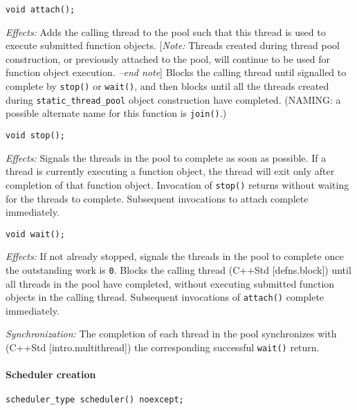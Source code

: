 \documentclass[a4paper,12pt,notitlepage,twoside,openright]{article}
\begin{document}
\begin{verbatim}
void attach();
\end{verbatim}

\emph{Effects:} Adds the calling thread to the pool such that this
thread is used to execute submitted function objects. {[}\emph{Note:}
Threads created during thread pool construction, or previously attached
to the pool, will continue to be used for function object execution.
\emph{--end note}{]} Blocks the calling thread until signalled to
complete by \texttt{stop()} or \texttt{wait()},
and then blocks until all the threads created during
\texttt{static_thread_pool} object construction have
completed. (NAMING: a possible alternate name for this function is
\texttt{join()}.)

\begin{verbatim}
void stop();
\end{verbatim}

\emph{Effects:} Signals the threads in the pool to complete as soon as
possible. If a thread is currently executing a function object, the
thread will exit only after completion of that function object.
Invocation of \texttt{stop()} returns without waiting for
the threads to complete. Subsequent invocations to attach complete
immediately.

\begin{verbatim}
void wait();
\end{verbatim}

\emph{Effects:} If not already stopped, signals the threads in the pool
to complete once the outstanding work is \texttt{0}. Blocks
the calling thread (C++Std {[}defns.block{]}) until all threads in the
pool have completed, without executing submitted function objects in the
calling thread. Subsequent invocations of \texttt{attach()}
complete immediately.

\emph{Synchronization:} The completion of each thread in the pool
synchronizes with (C++Std {[}intro.multithread{]}) the corresponding
successful \texttt{wait()} return.

\hypertarget{scheduler-creation}{%
\paragraph{Scheduler creation}\label{scheduler-creation}}

\begin{verbatim}
scheduler_type scheduler() noexcept;
\end{verbatim}
\end{document}

